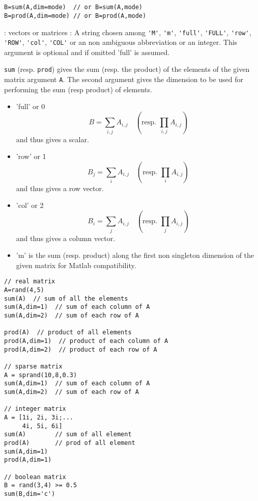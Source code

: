 \begin{mandesc}
  \\ %
  \\ %
\end{mandesc}
\begin{calling_sequence}
\begin{verbatim}
B=sum(A,dim=mode)  // or B=sum(A,mode)  
B=prod(A,dim=mode) // or B=prod(A,mode)  
\end{verbatim}
\end{calling_sequence}
\begin{parameters}
  \begin{varlist}
    : vectors or matrices
    : A string chosen among \verb+'M'+, \verb+'m'+, \verb+'full'+, \verb+'FULL'+, \verb+'row'+,
    \verb+'ROW'+, \verb+'col'+, \verb+'COL'+ or an non ambiguous abbreviation or an integer. 
    This argument is optional and if omitted 'full' is assumed.
  \end{varlist}
\end{parameters}
\begin{mandescription}
  \verb+sum+ (resp. \verb+prod+) gives the sum (resp. the product) of the elements of the given matrix
  argument \verb+A+. 
  The second argument gives the dimension to be used for performing the sum (resp product) of elements.
  \begin{itemize}
    \item 'full' or 0  $$B= \sum_{i,j} A_{i,j} \quad \left(\text{resp. } \prod_{i,j} A_{i,j} \right)$$ and thus gives a scalar.
    \item 'row' or 1  $$B_j = \sum_{i} A_{i,j}\quad \left(\text{resp. } \prod_{i} A_{i,j} \right)$$ and thus gives a row vector.
    \item 'col' or 2  $$B_i = \sum_{j} A_{i,j}\quad \left(\text{resp. } \prod_{j} A_{i,j}\right)$$ and thus gives a column vector.
    \item 'm' is the sum (resp. product) along the first non singleton dimension of the given matrix 
      for Matlab compatibility. 
  \end{itemize}
\end{mandescription}
\begin{examples}
\begin{Verbatim}
// real matrix 
A=rand(4,5)
sum(A)  // sum of all the elements 
sum(A,dim=1)  // sum of each column of A
sum(A,dim=2)  // sum of each row of A

prod(A)  // product of all elements
prod(A,dim=1)  // product of each column of A
prod(A,dim=2)  // product of each row of A

// sparse matrix 
A = sprand(10,8,0.3)
sum(A,dim=1)  // sum of each column of A
sum(A,dim=2)  // sum of each row of A

// integer matrix
A = [1i, 2i, 3i;...
     4i, 5i, 6i]
sum(A)        // sum of all element
prod(A)       // prod of all element
sum(A,dim=1)
prod(A,dim=1)

// boolean matrix 
B = rand(3,4) >= 0.5
sum(B,dim='c')
\end{Verbatim}
\end{examples}
\begin{manseealso}
     
\end{manseealso}

